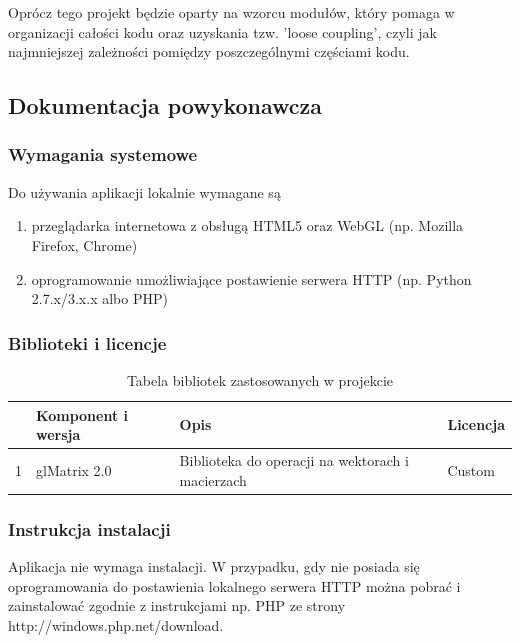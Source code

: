 \documentclass[11pt]{article}
\let\Oldsubsection\subsection
\renewcommand{\subsection}{\FloatBarrier\Oldsubsection}
\let\Oldsubsubsection\subsubsection
\renewcommand{\subsubsection}{\FloatBarrier\Oldsubsubsection}
\begin{document}
Oprócz tego projekt będzie oparty na wzorcu modułów, który pomaga w organizacji całości kodu oraz uzyskania tzw. 'loose coupling', czyli jak najmniejszej zależności pomiędzy poszczególnymi częściami kodu.



\subsection{Dokumentacja powykonawcza}

\subsubsection{Wymagania systemowe}
\par
Do używania aplikacji lokalnie wymagane są
\begin{enumerate}
\item przeglądarka internetowa z obsługą HTML5 oraz WebGL (np. Mozilla Firefox, Chrome)
\item oprogramowanie umożliwiające postawienie serwera HTTP (np. Python 2.7.x/3.x.x albo PHP)
\end{enumerate}
\par

\subsubsection{Biblioteki i licencje}
\begin{table}[!h]
\centering
\caption{Tabela bibliotek zastosowanych w projekcie}
\label{my-label}
\begin{tabularx}{\textwidth}{|X|X|X|X|}
\hline
\rowcolor[HTML]{C0C0C0} 
\multicolumn{1}{|l|}{\cellcolor[HTML]{C0C0C0}Lp} & \multicolumn{1}{l|}{\cellcolor[HTML]{C0C0C0}Komponent i wersja} & \multicolumn{1}{l|}{\cellcolor[HTML]{C0C0C0}Opis}                                & \multicolumn{1}{l|}{\cellcolor[HTML]{C0C0C0}Licencja} \\ \hline
1                                                & glMatrix 2.0& Biblioteka do operacji na wektorach i macierzach                                             & Custom \\\hline 
\end{tabularx}
\end{table}

\subsubsection{Instrukcja instalacji}
\par
Aplikacja nie wymaga instalacji. W przypadku, gdy nie posiada się oprogramowania do postawienia lokalnego serwera HTTP można pobrać i zainstalować zgodnie z instrukcjami np. PHP ze strony http://windows.php.net/download.
\end{document}

